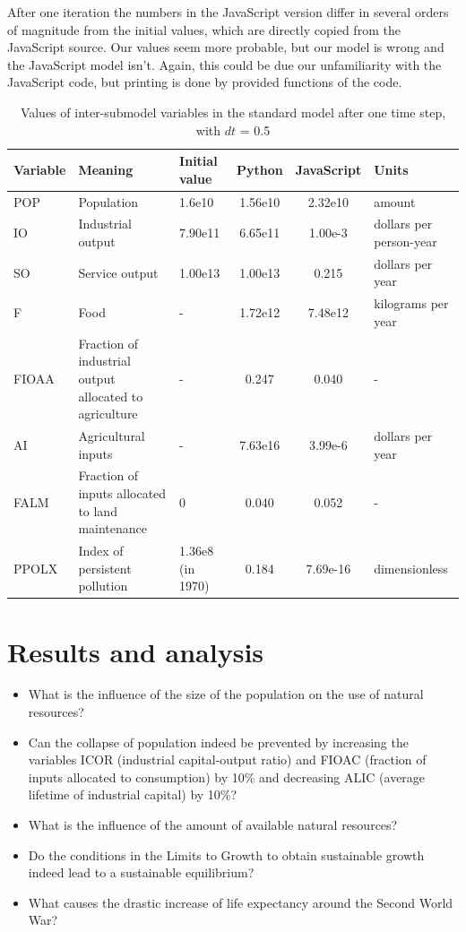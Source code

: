 \documentclass[10pt,a4paper]{scrartcl}
\begin{document}
After one iteration the numbers in the JavaScript version differ in several orders of magnitude from the initial values, which are directly copied from the JavaScript source. Our values seem more probable, but our model is wrong and the JavaScript model isn't. Again, this could be due our unfamiliarity with the JavaScript code, but printing is done by provided functions of the code.

\begin{table}
\centering
\begin{longtable}{|m{1.3cm}|m{3cm}|m{1.2cm}|c|c|m{2cm}|}
\hline
\textbf{Variable} & \textbf{Meaning} & \textbf{Initial value} & \textbf{Python} & \textbf{JavaScript} & \textbf{Units}\\
\hline
POP & Population & 1.6e10 & 1.56e10 & 2.32e10 & amount\\
\hline
IO & Industrial output & 7.90e11 & 6.65e11 & 1.00e-3 & dollars per person-year\\
\hline
SO & Service output & 1.00e13 & 1.00e13 & 0.215 & dollars per year\\
\hline
F & Food & - & 1.72e12 & 7.48e12 & kilograms per year\\
\hline
FIOAA & Fraction of industrial output allocated to agriculture & - & 0.247 & 0.040 & -\\
\hline
AI & Agricultural inputs & - & 7.63e16 & 3.99e-6 & dollars per year\\
\hline
FALM & Fraction of inputs allocated to land maintenance & 0 & 0.040 & 0.052 & -\\
\hline
PPOLX & Index of persistent pollution & 1.36e8 (in 1970) & 0.184 & 7.69e-16 & dimensionless\\
\hline
\end{longtable}
\caption{Values of inter-submodel variables in the standard model after one time step, with $dt$ = 0.5}
\label{value-differences}
\end{table}

\section*{Results and analysis}

\begin{itemize}
	\item What is the influence of the size of the population on the use of natural resources?
	\item Can the collapse of population indeed be prevented by increasing the variables ICOR (industrial capital-output ratio) and FIOAC (fraction of inputs allocated to consumption) by 10\% and decreasing ALIC (average lifetime of industrial capital) by 10\%?
	\item What is the influence of the amount of available natural resources?
	\item Do the conditions in the Limits to Growth to obtain sustainable growth indeed lead to a sustainable equilibrium?
	\item What causes the drastic increase of life expectancy around the Second World War?
\end{itemize}
\end{document}
